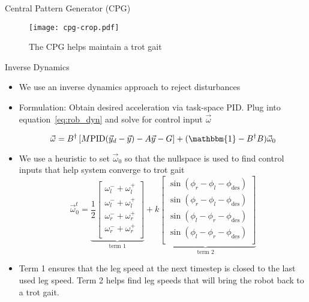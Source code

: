 \textcolor{prime}{\textsf{Central Pattern Generator (CPG)}} \\
\begin{figure}[h]
	\centering
    \texttt{[image: cpg-crop.pdf]}
    \caption{The CPG helps maintain a trot gait}
    \label{fig:CPG_Network}
\end{figure}
\vspace{-0.25in}

\vspace{1EX}
\textcolor{prime}{\textsf{Inverse Dynamics}} \\
\begin{itemize}
\item We use an inverse dynamics approach to reject disturbances
\item Formulation: Obtain desired acceleration via task-space PID. Plug into equation~\ref{eq:rob_dyn} and solve for control input $\vec{\omega}$

    \begin{equation*}
        \vec{\omega} = B^{\dagger} \left[M \mathrm{PID}(\vec{y}_d - \vec{y})- A \vec{y} - G \right] + (\mathbbm{1} - B^{\dagger} B) \vec{\omega}_0 \label{eq:control}
    \end{equation*}

\item We use a heuristic to set $\vec{\omega}_0$ so that the nullspace is used to find control inputs that help system converge to trot gait
\begin{equation}
    \vec{\omega}_0^t = \underbrace{\frac{1}{2}\begin{bmatrix}
        \omega_l^- + \omega_l^+ \\
        \omega_l^- + \omega_l^+ \\
        \omega_r^- + \omega_r^+ \\
        \omega_r^- + \omega_r^+ \\
    \end{bmatrix}}_{\text{term 1}} + 
    \underbrace{k \begin{bmatrix}
        \sin \left( \phi_r - \phi_l - \phi_{\mathrm{des}} \right) \\
        \sin \left( \phi_r - \phi_l - \phi_{\mathrm{des}} \right) \\
        \sin \left( \phi_l - \phi_r - \phi_{\mathrm{des}} \right) \\
        \sin \left( \phi_l - \phi_r - \phi_{\mathrm{des}} \right) \\
    \end{bmatrix}}_{\text{term 2}}
    \label{eq:hu}
\end{equation}

\item Term 1 ensures that the leg speed at the next timestep is closed to the last used leg speed. Term 2 helps find leg speeds that will bring the robot back to a trot gait.
\end{itemize}

